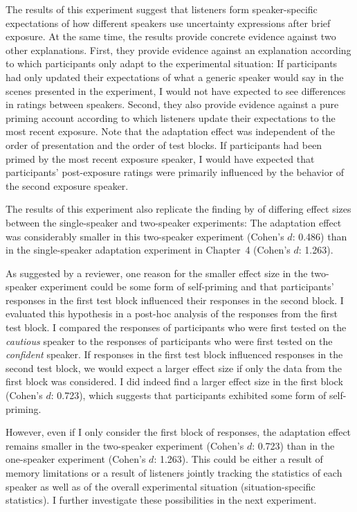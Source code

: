 The results of this experiment suggest that listeners form speaker-specific expectations 
of how different speakers use uncertainty expressions after brief exposure. At the same time, the results provide
concrete evidence against two other explanations. First, they provide evidence against an explanation
according to which participants only adapt to the experimental situation: If participants had only updated 
their expectations of what a generic speaker would say in the scenes presented
in the experiment, I would not have expected to see differences in ratings between speakers. Second, they also 
provide evidence against a pure priming account according to which listeners update their expectations to the most 
recent exposure. Note that the adaptation effect was independent of the order of presentation 
and the order of test blocks. If participants had been primed by the most recent exposure speaker, I would have
expected that participants' post-exposure ratings were primarily influenced by the behavior of the second exposure speaker.


The results of this experiment also replicate the 
finding by \textcite{Yildirim2016} of differing effect sizes between the single-speaker and
two-speaker experiments: The adaptation effect
was considerably smaller in this two-speaker experiment (Cohen's $d$: 0.486) than in 
the single-speaker adaptation experiment in Chapter~4 (Cohen's $d$: 1.263). 

As suggested by a reviewer, one reason for the smaller effect size in the two-speaker
experiment could be some form of self-priming and that participants' responses in the first 
test block influenced their responses in the second block. I evaluated this hypothesis
in a post-hoc analysis of the responses from the first test block. I 
compared the responses of participants who were first
tested on the \textit{cautious} speaker to the responses of participants who were first tested 
on the \textit{confident} speaker. If responses in the first test block influenced responses in 
the second test block, we would expect a larger effect size if only the data
from the first block was considered. I did indeed find a larger effect size in the first block (Cohen's $d$: 0.723), which
suggests that participants exhibited some form of self-priming.


However, even if I only consider the first block of responses, the adaptation effect 
remains smaller in the two-speaker experiment (Cohen's $d$: 0.723) than in the
one-speaker experiment (Cohen's $d$: 1.263). This could be either a result of memory limitations 
or a result of listeners jointly tracking the statistics of each speaker
as well as of the overall experimental situation (situation-specific statistics).
I further investigate these possibilities in the next experiment.


